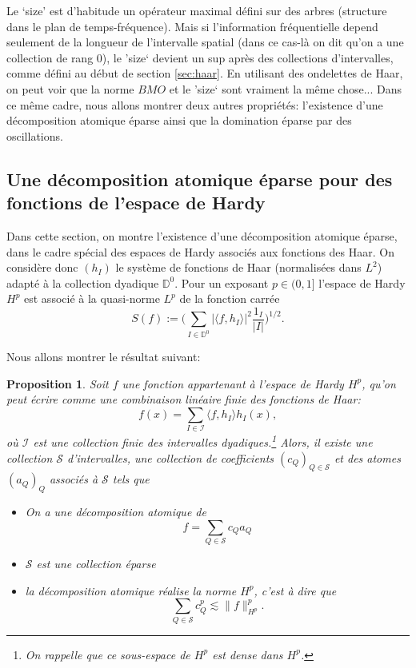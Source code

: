 \documentclass[11pt]{amsart}
\newtheorem{proposition}[theorem]{Proposition}
\newcommand{\ii}{\mathscr}
\newcommand{\ic}{\mathcal}
\newcommand{\mcS}{{\mathcal S}}
\newcommand{\Dy}{{\mathbb D}}
\begin{document}
Le `size' est d'habitude un op\'erateur maximal d\'efini sur des arbres (structure dans le plan de temps-fr\'equence). Mais si l'information fr\'equentielle depend seulement de la longueur de l'intervalle spatial (dans ce cas-l\`a on dit qu'on a une collection de rang $0$), le 'size` devient un sup apr\`es des collections d'intervalles, comme d\'efini au d\'ebut de section \ref{sec:haar}. En utilisant des ondelettes de Haar, on peut voir que la norme $BMO$ et le 'size` sont vraiment la m\^eme chose... Dans ce m\^eme cadre, nous allons montrer deux autres propri\'et\'es: l'existence d'une d\'ecomposition atomique \'eparse ainsi que la domination \'eparse par des oscillations.


\subsection{Une d\'ecomposition atomique \'eparse pour des fonctions de l'espace de Hardy}
\label{sec:atomic-dec}

Dans cette section, on montre l'existence d'une d\'ecomposition atomique \'eparse, dans le cadre sp\'ecial des espaces de Hardy associ\'es aux fonctions des Haar. 
On consid\`ere donc $(h_I)$ le syst\`eme de fonctions de Haar (normalis\'ees dans $L^2$) adapt\'e \`a la collection dyadique $\Dy^0$. Pour un exposant $p\in(0,1]$ l'espace de Hardy $H^p$ est associ\'e \`a la quasi-norme $L^p$ de la fonction carr\'ee
\begin{equation} S(f):= \Big( \sum_{I\in \Dy^0} |\langle f, h_I\rangle|^2 \frac{1_I}{|I|} \Big)^{1/2}. \label{eq:fonctioncarree}
\end{equation}

Nous allons montrer le r\'esultat suivant:

\begin{proposition} Soit $f$ une fonction appartenant \`a l'espace de Hardy $H^p$, qu'on peut \'ecrire comme une combinaison lin\'eaire finie des fonctions de Haar:
\[
f(x)=\sum_{I \in \ii{I} } \langle f, h_I \rangle h_I(x),
\]
o\`u $\ii I$ est une collection finie des intervalles dyadiques.\footnote{On rappelle que ce sous-espace de $H^p$ est dense dans $H^p$.}
Alors, il existe une collection $\mcS$ d'intervalles, une collection de coefficients $(c_Q)_{Q\in \mcS}$ et des atomes $(a_Q)_Q$ associ\'es \`a $\mcS$ tels que
\begin{itemize}
\item[$\bullet$] On a une d\'ecomposition atomique de 
$$ f =\sum_{Q \in \ic{S}} c_Q a_Q$$
\item[$\bullet$] $\mcS$ est une collection \'eparse
\item[$\bullet$] la d\'ecomposition atomique r\'ealise la norme $H^p$, c'est \`a dire que 
$$ \sum_{Q \in \mathcal{S}} c_Q^p \lesssim \|f\|_{H^p}^p.$$
\end{itemize}
\end{proposition}
\end{document}
